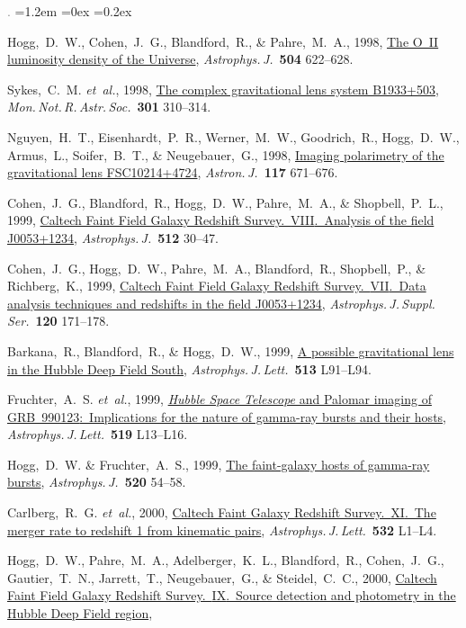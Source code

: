 \documentclass[10pt,letterpaper]{article}
\newcommand{\acronym}[1]{{\small{#1}}}
\newcommand{\foreign}[1]{\textsl{#1}}
\newcommand{\etal}{\foreign{et~al.}}
\newcommand{\project}[1]{\textsl{#1}}
\newcommand{\doi}[2]{\href{http://dx.doi.org/#1}{{#2}}}
\newcommand{\deemph}[1]{\textcolor{grey}{\footnotesize{#1}}}
\newcommand{\pubnumber}[1]{\deemph{{#1}.}}
\newcounter{refpubnum}
\newcommand{\hogglist}{%
    \rightmargin=0in
    \leftmargin=1.2em
    \topsep=0ex
    \partopsep=0pt
    \itemsep=0.2ex
    \parsep=0pt
    \itemindent=-1.0\leftmargin
    \listparindent=0.0\leftmargin
    \settowidth{\labelsep}{~}
    \usecounter{refpubnum}
  }
\begin{document}
\begin{list}{\pubnumber{\therefpubnum}}{\hogglist}
\item
Hogg,~D.~W., Cohen,~J.~G., Blandford,~R., \& Pahre,~M.~A., 1998,
\doi{10.1086/306122}{The O~II luminosity density of the Universe},
\textit{Astrophys.\,J.}\ \textbf{504} 622--628.
\item
Sykes,~C.~M. \etal, 1998,
\doi{10.1046/j.1365-8711.1998.02081.x}{The complex gravitational lens system B1933+503},
\textit{Mon.\,Not.\,R.\,Astr.\,Soc.}\ \textbf{301} 310--314.
\item
Nguyen,~H.~T., Eisenhardt,~P.~R., Werner,~M.~W., Goodrich,~R., Hogg,~D.~W., Armus,~L., Soifer,~B.~T., \& Neugebauer,~G., 1998,
\doi{10.1086/300742}{Imaging polarimetry of the gravitational lens FSC10214+4724},
\textit{Astron.\,J.}\ \textbf{117} 671--676.
\item
Cohen,~J.~G., Blandford,~R., Hogg,~D.~W., Pahre,~M.~A., \& Shopbell,~P.~L., 1999,
\doi{10.1086/306778}{Caltech Faint Field Galaxy Redshift Survey.\ \acronym{VIII}.\ Analysis of the field J0053+1234},
\textit{Astrophys.\,J.}\ \textbf{512} 30--47.
\item
Cohen,~J.~G., Hogg,~D.~W., Pahre,~M.~A., Blandford,~R., Shopbell,~P., \& Richberg,~K., 1999,
\doi{10.1086/313184}{Caltech Faint Field Galaxy Redshift Survey.\ \acronym{VII}.\ Data analysis techniques and redshifts in the field J0053+1234},
\textit{Astrophys.\,J.\,Suppl.\,Ser.}\ \textbf{120} 171--178.
\item
Barkana,~R., Blandford,~R., \& Hogg,~D.~W., 1999,
\doi{10.1086/311924}{A possible gravitational lens in the Hubble Deep Field South},
\textit{Astrophys.\,J.\,Lett.}\ \textbf{513} L91--L94.
\item
Fruchter,~A.~S. \etal, 1999,
\doi{10.1086/312094}{\project{Hubble Space Telescope} and Palomar imaging of \acronym{GRB~990123}:\ Implications for the nature of gamma-ray bursts and their hosts},
\textit{Astrophys.\,J.\,Lett.}\ \textbf{519} L13--L16.
\item
Hogg,~D.~W. \& Fruchter,~A.~S., 1999,
\doi{10.1086/307457}{The faint-galaxy hosts of gamma-ray bursts},
\textit{Astrophys.\,J.}\ \textbf{520} 54--58.
\item
Carlberg,~R.~G. \etal, 2000,
\doi{10.1086/312560}{Caltech Faint Galaxy Redshift Survey.\ \acronym{XI}.\ The merger rate to redshift 1 from kinematic pairs},
\textit{Astrophys.\,J.\,Lett.}\ \textbf{532} L1--L4.
\item
Hogg,~D.~W., Pahre,~M.~A., Adelberger,~K.~L., Blandford,~R., Cohen,~J.~G., Gautier,~T.~N., Jarrett,~T., Neugebauer,~G., \& Steidel,~C.~C., 2000,
\doi{10.1086/313318}{Caltech Faint Field Galaxy Redshift Survey.\ \acronym{IX}.\ Source detection and photometry in the Hubble Deep Field region},

\end{list}
\end{document}
